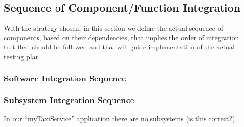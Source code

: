 \subsection{Sequence of Component/Function Integration}
With the strategy chosen, in this section we define the actual sequence of components, based on their dependencies, that implies the order of integration test that should be followed and that will guide implementation of the actual testing plan. 
\subsubsection{Software Integration Sequence}
\subsubsection{Subsystem Integration Sequence}
In our ``myTaxiService'' application there are no subsystems (is this correct?).